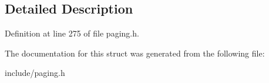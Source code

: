 \subsection{Detailed Description}


Definition at line 275 of file paging.\-h.



The documentation for this struct was generated from the following file\-:\begin{DoxyCompactItemize}
\item 
include/paging.\-h\end{DoxyCompactItemize}
